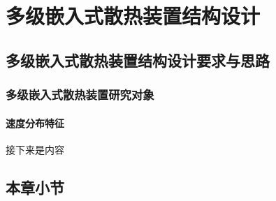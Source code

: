 \chapter{多级嵌入式散热装置结构设计}

\section{多级嵌入式散热装置结构设计要求与思路}
\subsection{多级嵌入式散热装置研究对象}
\subsubsection{速度分布特征}
接下来是内容

\section{本章小节}
